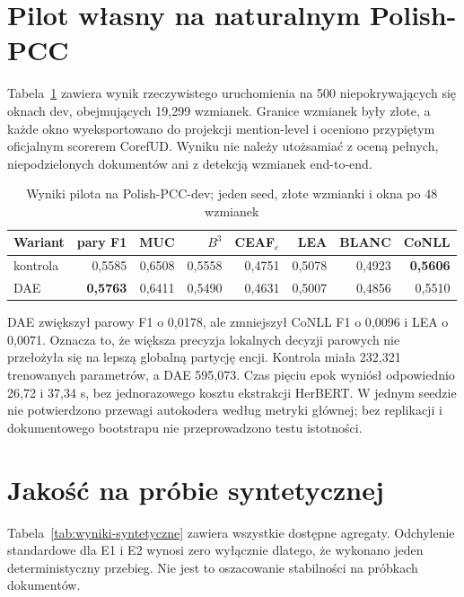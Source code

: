 \section{Pilot własny na naturalnym Polish-PCC}
\label{sec:pilot-pcc-real}

Tabela~\ref{tab:wyniki-pcc-real} zawiera wynik rzeczywistego uruchomienia na 500 niepokrywających się oknach dev, obejmujących 19,299 wzmianek. Granice wzmianek były złote, a każde okno wyeksportowano do projekcji mention-level i oceniono przypiętym oficjalnym scorerem CorefUD. Wyniku nie należy utożsamiać z oceną pełnych, niepodzielonych dokumentów ani z detekcją wzmianek end-to-end.

\begin{table}[htbp]
  \centering
  \caption{Wyniki pilota na Polish-PCC-dev; jeden seed, złote wzmianki i okna po 48 wzmianek}
  \label{tab:wyniki-pcc-real}
  \begin{tabular}{lrrrrrrr}
    \toprule
    Wariant & pary F1 & MUC & $B^3$ & CEAF$_e$ & LEA & BLANC & CoNLL \\
    \midrule
    kontrola & 0,5585 & 0,6508 & 0,5558 & 0,4751 & 0,5078 & 0,4923 & \textbf{0,5606} \\
    DAE & \textbf{0,5763} & 0,6411 & 0,5490 & 0,4631 & 0,5007 & 0,4856 & 0,5510 \\
    \bottomrule
  \end{tabular}
\end{table}

DAE zwiększył parowy F1 o 0,0178, ale zmniejszył CoNLL F1 o 0,0096 i LEA o 0,0071. Oznacza to, że większa precyzja lokalnych decyzji parowych nie przełożyła się na lepszą globalną partycję encji. Kontrola miała 232,321 trenowanych parametrów, a DAE 595,073. Czas pięciu epok wyniósł odpowiednio 26,72 i 37,34 s, bez jednorazowego kosztu ekstrakcji HerBERT. W jednym seedzie nie potwierdzono przewagi autokodera według metryki głównej; bez replikacji i dokumentowego bootstrapu nie przeprowadzono testu istotności.

\section{Jakość na próbie syntetycznej}
\label{sec:jakosc-syntetyczna}

Tabela~\ref{tab:wyniki-syntetyczne} zawiera wszystkie dostępne agregaty. Odchylenie standardowe dla E1 i E2 wynosi zero wyłącznie dlatego, że wykonano jeden deterministyczny przebieg. Nie jest to oszacowanie stabilności na próbkach dokumentów.

